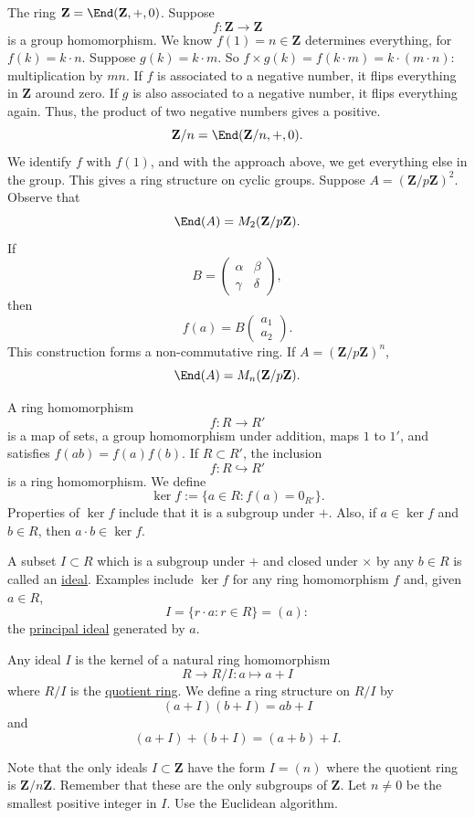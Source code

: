 \documentclass[11pt, oneside]{amsart}
\numberwithin{equation}{section}
\numberwithin{theorem}{section}
\theoremstyle{definition}
\def\Z{\mathbf{Z}}
\begin{document}
{The ring $\Z = \End(\Z, +, 0)$. Suppose 
$$
f:\Z\to\Z
$$
is a group homomorphism. We know $f(1) = n\in \Z$ determines everything, for $f(k) = k\cdot n$. Suppose $g(k) = k\cdot m $. So $f\times g(k) = f(k\cdot m) = k\cdot(m\cdot n )$: multiplication by $mn$.  If $f$ is associated to a negative number, it flips everything in $\Z$ around zero. If $g$ is also associated to a negative number, it flips everything again. Thus, the product of two negative numbers gives a positive. 
$$
\Z/n = \End(\Z/n, +, 0).
$$ 
We identify $f$ with $f(1)$, and with the approach above, we get everything else in the group. This gives a ring structure on cyclic groups. Suppose $A =(\Z/p\Z)^2$. Observe that
$$
\End(A) = M_2(\Z/p\Z).
$$
If 
$$
B = \left(\begin{array}{cc} \alpha &\beta\\\gamma&\delta\end{array}\right),
$$
then 
$$
f(a) = B \left(\begin{array}{c}a_1\\a_2\end{array}\right).
$$
This construction forms a non-commutative ring. If $A =(\Z/p\Z)^n$, 
$$
\End(A) = M_n(\Z/p\Z).
$$

A ring homomorphism
$$
f : R\to R'
$$
is a map of sets, a group homomorphism under addition, maps $1$ to $1'$, and satisfies $f(ab) = f(a)f(b)$. If $R\subset R'$, the inclusion
$$
f : R\hookrightarrow R' 
$$
is a ring homomorphism. We define 
$$
\ker f := \{a\in R : f(a) = 0_{R'}\}.
$$
Properties of $\ker f$ include that it is a subgroup under $+$. Also, if $a\in \ker f$ and $b\in R$, then $a\cdot b \in \ker f$. 

A subset $I\subset R$ which is a subgroup under $+$ and closed under $\times$ by any $b\in R$ is called an \underline{ideal}. Examples include $\ker f$ for any ring homomorphism $f$ and, given $a\in R$, 
$$
I = \{r\cdot a : r\in R\} = (a):
$$ 
the \underline{principal ideal} generated by $a$.

Any ideal $I$ is the kernel of a natural ring homomorphism 
$$
R \to R/I : a\mapsto a+I
$$ 
where $R/I$ is the \underline{quotient ring}. We define a ring structure on $R/I$ by 
$$
(a+I)(b+I) = ab + I 
$$
and
$$
(a+ I) + (b+I) = (a+b) + I.
$$

Note that the only ideals $I\subset \Z$ have the form $I=(n)$ where the quotient ring is $\Z/n\Z$. Remember that these are the only subgroups of $\Z$. Let $n\neq 0$ be the smallest positive integer in $I$. Use the Euclidean algorithm. 

}
\end{document}

